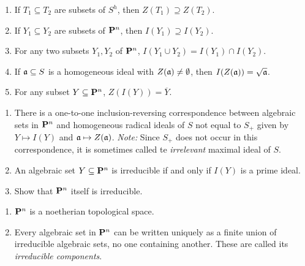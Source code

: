 \documentclass[10pt]{amsart}
\begin{document}
\begin{exercise}[Exercise 2.3]
    \begin{enumerate}
        \item If $T_1 \subseteq T_2$ are subsets of $S^h$, then $Z(T_1) \supseteq
        Z(T_2)$.
      \item If $Y_1 \subseteq Y_2$ are subsets of ${\bf P}^n$, then $I(Y_1) \supseteq
        I(Y_2)$.
      \item For any two subsets $Y_1,Y_2$ of ${\bf P}^n$, $I(Y_1 \cup Y_2) = I(Y_1)
        \cap I(Y_2)$.
      \item If $\mathfrak{a} \subseteq S$ is a homogeneous ideal with
        $Z(\mathfrak{a}) \ne \emptyset$, then $I(Z(\mathfrak{a})) =
        \sqrt{\mathfrak{a}}$.
      \item For any subset $Y \subseteq {\bf P}^n$, $Z(I(Y)) = \overline{Y}$.
    \end{enumerate}
\end{exercise}

\begin{solution}

\end{solution}

\begin{exercise}[Exercise 2.4]
    \begin{enumerate}
        \item There is a one-to-one inclusion-reversing correspondence between
        algebraic sets in ${\bf P}^n$ and homogeneous radical ideals of $S$ not equal
        to $S_+$ given by $Y \mapsto I(Y)$ and $\mathfrak{a} \mapsto
        Z(\mathfrak{a})$. \emph{Note:} Since $S_{+}$ does not occur in this correspondence, 
        it is sometimes called te \emph{irrelevant} maximal ideal of $S$. 
        
        \item An algebraic set $Y \subseteq {\bf P}^n$ is irreducible if and only if $I(Y)$ is a prime ideal. 
        \item Show that ${\bf P}^n$ itself is irreducible. 
    \end{enumerate}
\end{exercise}

\begin{solution}

\end{solution}

\begin{exercise}[Exercise 2.5]
    \begin{enumerate}
        \item ${\bf P}^n$ is a noetherian topological space. 
        \item Every algebraic set in ${\bf P}^n$ can be written uniquely as a finite
          union of irreducible algebraic sets, no one containing another. These are
          called its \emph{irreducible components}. 
    \end{enumerate}
\end{exercise}
\end{document}

